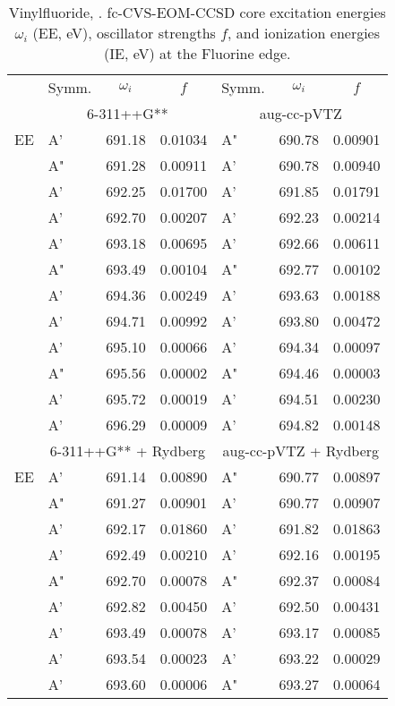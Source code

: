 \documentclass[journal=jctcce,manuscript=article]{achemso}
\begin{document}
\begin{table}[H]
\caption{Vinylfluoride, . fc-CVS-EOM-CCSD core excitation energies $\omega_i$ (EE, eV), oscillator strengths $f$, and ionization energies (IE, eV) at the Fluorine edge.}
\label{Tab:Vinylfluoride:F}
\scriptsize
\begin{tabular}{l|lcc|lcc}
\cline{2-7}
& Symm. & $\omega_i$ & $f$ & Symm. & $\omega_i$ & $f$ \\
\cline{2-7}
& \multicolumn{3}{c|}{6-311++G**} & \multicolumn{3}{c}{aug-cc-pVTZ} \\
\hline
EE
& A' & 691.18 & 0.01034	& A" & 690.78 & 0.00901 \\
& A" & 691.28 & 0.00911	& A' & 690.78 & 0.00940 \\
& A' & 692.25 & 0.01700	& A' & 691.85 & 0.01791 \\
& A' & 692.70 & 0.00207	& A' & 692.23 & 0.00214 \\
& A' & 693.18 & 0.00695	& A' & 692.66 & 0.00611 \\
& A" & 693.49 & 0.00104	& A" & 692.77 & 0.00102 \\
& A' & 694.36 & 0.00249	& A' & 693.63 & 0.00188 \\
& A' & 694.71 & 0.00992	& A' & 693.80 & 0.00472 \\
& A' & 695.10 & 0.00066	& A' & 694.34 & 0.00097 \\
& A" & 695.56 & 0.00002	& A" & 694.46 & 0.00003 \\
& A' & 695.72 & 0.00019	& A' & 694.51 & 0.00230 \\
& A' & 696.29 & 0.00009	& A' & 694.82 & 0.00148 \\
\cline{2-7}
& \multicolumn{3}{c|}{6-311++G** + Rydberg} & \multicolumn{3}{c}{aug-cc-pVTZ + Rydberg} \\
\hline
  EE
& A' & 691.14 & 0.00890	& A" & 690.77 & 0.00897 \\
& A" & 691.27 & 0.00901	& A' & 690.77 & 0.00907 \\
& A' & 692.17 & 0.01860	& A' & 691.82 & 0.01863 \\
& A' & 692.49 & 0.00210	& A' & 692.16 & 0.00195 \\
& A" & 692.70 & 0.00078	& A" & 692.37 & 0.00084 \\
& A' & 692.82 & 0.00450	& A' & 692.50 & 0.00431 \\
& A' & 693.49 & 0.00078	& A' & 693.17 & 0.00085 \\
& A' & 693.54 & 0.00023	& A' & 693.22 & 0.00029 \\
& A' & 693.60 & 0.00006	& A" & 693.27 & 0.00064 \\

\end{tabular}
\end{table}
\end{document}
